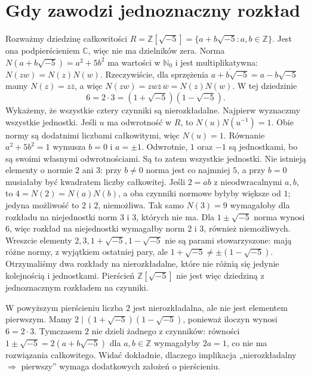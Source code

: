 \section{Gdy zawodzi jednoznaczny rozkład}
\begin{przyklad}
\label{aa:prz:zsqrtminus5}
Rozważmy dziedzinę całkowitości
$R=\mathbb Z[\sqrt{-5}]=\{a+b\sqrt{-5}:a,b\in\mathbb Z\}$.
Jest ona podpierścieniem $\mathbb C$, więc nie ma dzielników
zera. Norma $N(a+b\sqrt{-5})=a^2+5b^2$ ma wartości w
$\mathbb N_0$ i jest multiplikatywna:
$N(zw)=N(z)N(w)$. Rzeczywiście, dla sprzężenia
$\overline{a+b\sqrt{-5}}=a-b\sqrt{-5}$ mamy
$N(z)=z\overline z$, a więc
$N(zw)=zw\overline z\,\overline w=N(z)N(w)$. W tej dziedzinie
\[
6=2\cdot3=(1+\sqrt{-5})(1-\sqrt{-5}).
\]
Wykażemy, że wszystkie cztery czynniki są nierozkładalne.
Najpierw wyznaczmy wszystkie jednostki. Jeśli $u$ ma
odwrotność w $R$, to $N(u)N(u^{-1})=1$. Obie normy są
dodatnimi liczbami całkowitymi, więc $N(u)=1$.
Równanie $a^2+5b^2=1$ wymusza $b=0$ i $a=\pm1$.
Odwrotnie, $1$ oraz $-1$ są jednostkami, bo są swoimi
własnymi odwrotnościami. Są to zatem wszystkie jednostki.
Nie istnieją elementy o normie $2$ ani $3$:
przy $b\ne0$ norma jest co najmniej $5$, a przy $b=0$
musiałaby być kwadratem liczby całkowitej.
Jeśli $2=ab$ z nieodwracalnymi $a,b$, to
$4=N(2)=N(a)N(b)$, a oba czynniki normowe byłyby
większe od $1$; jedyna możliwość to $2$ i $2$, niemożliwa.
Tak samo $N(3)=9$ wymagałoby dla rozkładu na niejednostki
norm $3$ i $3$, których nie ma. Dla
$1\pm\sqrt{-5}$ norma wynosi $6$, więc rozkład
na niejednostki wymagałby norm $2$ i $3$, również niemożliwych.
Wreszcie elementy $2,3,1+\sqrt{-5},1-\sqrt{-5}$
nie są parami stowarzyszone: mają różne normy, z wyjątkiem
ostatniej pary, ale $1+\sqrt{-5}\ne\pm(1-\sqrt{-5})$.
Otrzymaliśmy dwa rozkłady na nierozkładalne, które nie
różnią się jedynie kolejnością i jednostkami.
Pierścień $\mathbb Z[\sqrt{-5}]$ nie jest więc dziedziną
z jednoznacznym rozkładem na czynniki.
\end{przyklad}

\begin{przyklad}
\label{aa:prz:irred-not-prime}
W powyższym pierścieniu liczba $2$ jest nierozkładalna,
ale nie jest elementem pierwszym. Mamy
$2\mid (1+\sqrt{-5})(1-\sqrt{-5})$, ponieważ iloczyn
wynosi $6=2\cdot3$. Tymczasem $2$ nie dzieli żadnego
z czynników: równości
$1\pm\sqrt{-5}=2(a+b\sqrt{-5})$ dla $a,b\in\mathbb Z$
wymagałyby $2a=1$, co nie ma rozwiązania całkowitego.
Widać dokładnie, dlaczego implikacja
„nierozkładalny $\Rightarrow$ pierwszy” wymaga dodatkowych
założeń o pierścieniu.
\end{przyklad}

